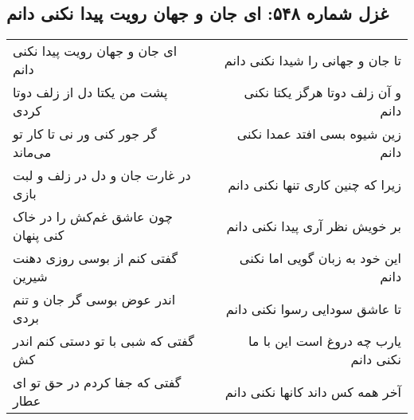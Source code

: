 \begin{center}
\section*{غزل شماره ۵۴۸: ای جان و جهان رویت پیدا نکنی دانم}
\label{sec:548}
\begin{longtable}{l p{0.5cm} r}
ای جان و جهان رویت پیدا نکنی دانم
&&
تا جان و جهانی را شیدا نکنی دانم
\\
پشت من یکتا دل از زلف دوتا کردی
&&
و آن زلف دوتا هرگز یکتا نکنی دانم
\\
گر جور کنی ور نی تا کار تو می‌ماند
&&
زین شیوه بسی افتد عمدا نکنی دانم
\\
در غارت جان و دل در زلف و لبت بازی
&&
زیرا که چنین کاری تنها نکنی دانم
\\
چون عاشق غم‌کش را در خاک کنی پنهان
&&
بر خویش نظر آری پیدا نکنی دانم
\\
گفتی کنم از بوسی روزی دهنت شیرین
&&
این خود به زبان گویی اما نکنی دانم
\\
اندر عوض بوسی گر جان و تنم بردی
&&
تا عاشق سودایی رسوا نکنی دانم
\\
گفتی که شبی با تو دستی کنم اندر کش
&&
یارب چه دروغ است این با ما نکنی دانم
\\
گفتی که جفا کردم در حق تو ای عطار
&&
آخر همه کس داند کانها نکنی دانم
\\
\end{longtable}
\end{center}
